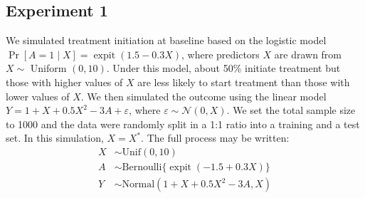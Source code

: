 \subsection{Experiment 1}
We simulated treatment initiation at baseline based on the logistic model $\Pr[A=1 \mid X]=\operatorname{expit} (1.5-0.3 X)$, where predictors $X$ are drawn from $X \sim$ Uniform $(0,10)$. Under this model, about 50\% initiate treatment but those with higher values of $X$ are less likely to start treatment than those with lower values of $X$. We then simulated the outcome using the linear model $Y=1+X+0.5 X^2- 3A + \varepsilon$, where $\varepsilon \sim \mathcal{N}(0, X)$.  We set the total sample size to 1000 and the data were randomly split in a 1:1 ratio into a training and a test set. In this simulation, $X = X^*$. The full process may be written:
\begin{align*}
    X & \sim \text{Unif}(0, 10) \\
    A & \sim \text{Bernoulli}\{\operatorname{expit}(-1.5 + 0.3 X)\} \\
    Y & \sim \text{Normal}(1 + X + 0.5 X^2 - 3 A, X)
\end{align*}    
 
